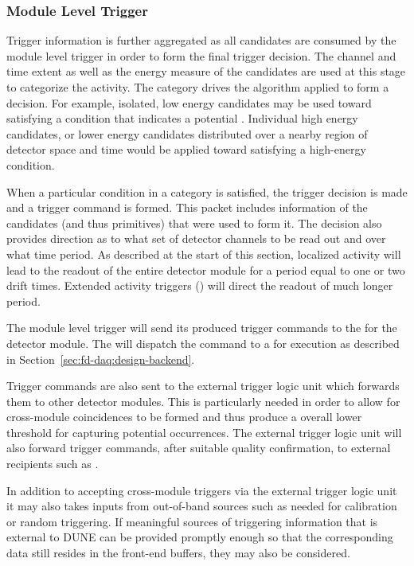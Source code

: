 \subsubsection{Module Level Trigger}

Trigger information is further aggregated as all candidates are consumed
by the module level trigger in order to form the final trigger decision. 
The channel and time extent as well as the energy measure of the
candidates are used at this stage to categorize the activity. 
The category drives the algorithm applied to form a decision.
For example, isolated, low energy candidates may be used toward
satisfying a condition that indicates a potential . 
Individual high energy candidates, or lower energy candidates
distributed over a nearby region of detector space and time would be
applied toward satisfying a high-energy condition. 

When a particular condition in a category is satisfied, the trigger
decision is made and a trigger command is formed. 
This packet includes information of the candidates (and thus primitives)
that were used to form it. 
The decision also provides direction as to what set of detector channels
to be read out and over what time period.
As described at the start of this section, localized activity will lead
to the readout of the entire detector module for a period equal to one
or two drift times.  Extended activity triggers () will
direct the readout of much longer period.

The module level trigger will send its produced trigger commands to the
 for the detector module.  The
 will dispatch the command to a  for
execution as described in Section~\ref{sec:fd-daq:design-backend}.

Trigger commands are also sent to the external trigger logic unit which
forwards them to other detector modules. 
This is particularly needed in order to allow for cross-module
coincidences to be formed and thus produce a overall lower threshold for
capturing potential  occurrences. 
The external trigger logic unit will also forward  trigger
commands, after suitable quality confirmation, to external recipients
such as .

In addition to accepting cross-module triggers via the external trigger
logic unit it may also takes inputs from out-of-band sources such as
needed for calibration or random triggering. 
If meaningful sources of triggering information that is external to
DUNE can be provided promptly enough so that the corresponding data
still resides in the front-end buffers, they may also be considered.


